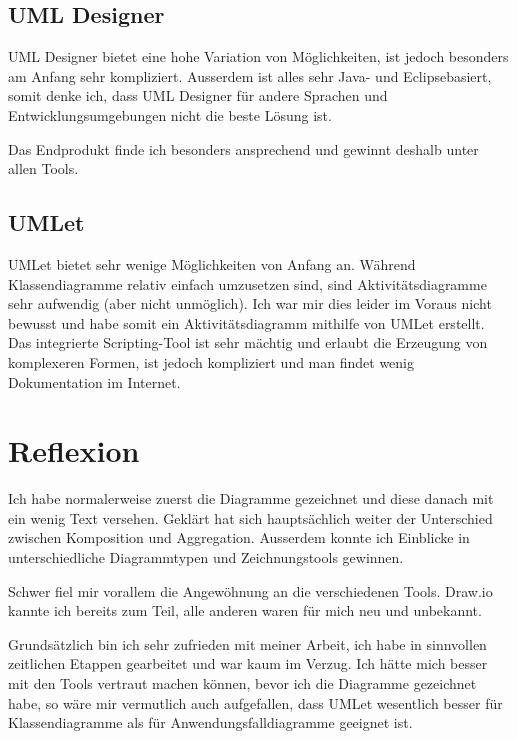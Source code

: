 \documentclass[a4paper, titlepage]{scrartcl}
\begin{document}
    \subsection{UML Designer}
    UML Designer bietet eine hohe Variation von Möglichkeiten, ist jedoch besonders
    am Anfang sehr kompliziert. Ausserdem ist alles sehr Java- und Eclipsebasiert,
    somit denke ich, dass UML Designer für andere Sprachen und Entwicklungsumgebungen
    nicht die beste Lösung ist.

    Das Endprodukt finde ich besonders ansprechend und gewinnt deshalb unter allen Tools.

    \subsection{UMLet}
    UMLet bietet sehr wenige Möglichkeiten von Anfang an. Während Klassendiagramme
    relativ einfach umzusetzen sind, sind Aktivitätsdiagramme sehr aufwendig (aber
    nicht unmöglich). Ich war mir dies leider im Voraus nicht bewusst und habe somit
    ein Aktivitätsdiagramm mithilfe von UMLet erstellt. Das integrierte Scripting-Tool
    ist sehr mächtig und erlaubt die Erzeugung von komplexeren Formen, ist jedoch
    kompliziert und man findet wenig Dokumentation im Internet.

    \section{Reflexion}
    Ich habe normalerweise zuerst die Diagramme gezeichnet und diese danach mit ein
    wenig Text versehen. Geklärt hat sich hauptsächlich weiter der Unterschied zwischen
    Komposition und Aggregation. Ausserdem konnte ich Einblicke in unterschiedliche
    Diagrammtypen und Zeichnungstools gewinnen.

    Schwer fiel mir vorallem die Angewöhnung an die verschiedenen Tools. Draw.io kannte
    ich bereits zum Teil, alle anderen waren für mich neu und unbekannt.

    Grundsätzlich bin ich sehr zufrieden mit meiner Arbeit, ich habe in sinnvollen
    zeitlichen Etappen gearbeitet und war kaum im Verzug. Ich hätte mich besser mit
    den Tools vertraut machen können, bevor ich die Diagramme gezeichnet habe, so
    wäre mir vermutlich auch aufgefallen, dass UMLet wesentlich besser für Klassendiagramme
    als für Anwendungsfalldiagramme geeignet ist.
    
\end{document}
